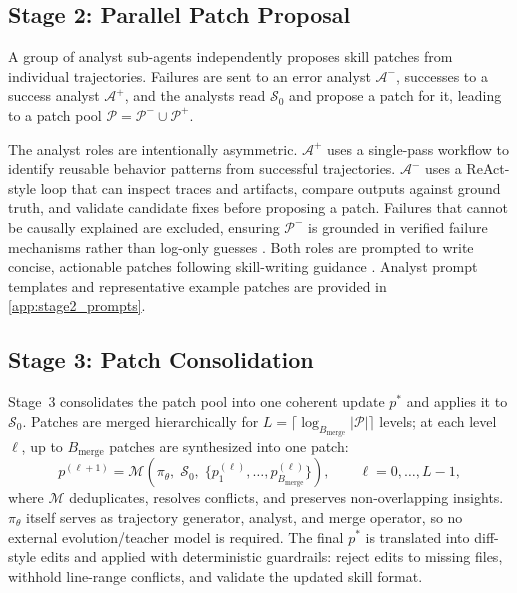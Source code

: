\subsection{Stage 2: Parallel Patch Proposal}
\label{sec:method:swarm}

A group of analyst sub-agents independently proposes skill patches from individual trajectories.
Failures are sent to an error analyst $\mathcal{A}^-$, successes to a success analyst $\mathcal{A}^+$, and the analysts read $\mathcal{S}_0$ and propose a patch for it, leading to a patch pool $\mathcal{P}=\mathcal{P}^-\cup\mathcal{P}^+$.

The analyst roles are intentionally asymmetric.
$\mathcal{A}^+$ uses a single-pass workflow to identify reusable behavior patterns from successful trajectories.
$\mathcal{A}^-$ uses a ReAct-style loop that can inspect traces and artifacts, compare outputs against ground truth, and validate candidate fixes before proposing a patch.
Failures that cannot be causally explained are excluded, ensuring $\mathcal{P}^-$ is grounded in verified failure mechanisms rather than log-only guesses \citep{ouyang2026reasoningbankscalingagentselfevolving}.
Both roles are prompted to write concise, actionable patches following skill-writing guidance \citep{anthropic2026skillcreatorconversation}.
Analyst prompt templates and representative example patches are provided in \cref{app:stage2_prompts}.

\subsection{Stage 3: Patch Consolidation}
\label{sec:method:consolidation}

Stage~3 consolidates the patch pool into one coherent update $p^*$ and applies it to $\mathcal{S}_0$.
Patches are merged hierarchically for $L=\lceil \log_{B_\text{merge}}|\mathcal{P}| \rceil$ levels; at each level $\ell$, up to $B_\text{merge}$ patches are synthesized into one patch:
\begin{equation}
    p^{(\ell+1)}
    = \mathcal{M}\!\left(\pi_\theta,\; \mathcal{S}_0,\; \{p_1^{(\ell)}, \ldots, p_{B_\text{merge}}^{(\ell)}\}\right),
    \qquad \ell=0,\ldots,L-1,
\end{equation}
where $\mathcal{M}$ deduplicates, resolves conflicts, and preserves non-overlapping insights.
$\pi_\theta$ itself serves as trajectory generator, analyst, and merge operator, so no external evolution/teacher model is required.
The final $p^*$ is translated into diff-style edits and applied with deterministic guardrails: reject edits to missing files, withhold line-range conflicts, and validate the updated skill format.

